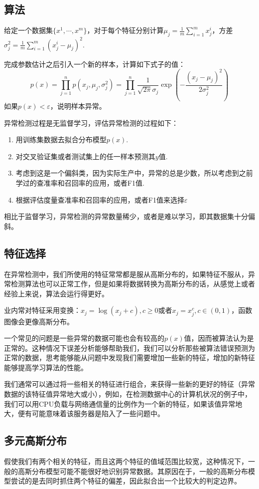 \documentclass[cn,hazy,blue,normal,14pt]{elegantnote}
\begin{document}
\subsection{算法}
给定一个数据集$\{x^1,\cdots,x^m\}$，对于每个特征分别计算$\mu_j=\frac{1}{m}\sum\limits_{i=1}^m x_j^i$，方差$\sigma_j^2=\frac{1}{m}\sum\limits_{i=1}^m (x_j^i-\mu_j)^2$.

完成参数估计之后引入一个新的样本，计算如下式子的值：
$$
p(x)=\prod_{j=1}^n p(x_j,\mu_j,\sigma_j^2)=\prod_{j=1}^n \frac{1}{\sqrt{2\pi}\sigma_j}\exp{(-\frac{(x_j-\mu_j)^2}{2\sigma_j^2})}
$$
如果$p(x)<\varepsilon$，说明样本异常。

异常检测过程是无监督学习，评估异常检测的过程如下：
\begin{enumerate}
    \item 用训练集数据去拟合分布模型$p(x)$.
    \item 对交叉验证集或者测试集上的任一样本预测其$y$值.
    \item 考虑到这是一个偏斜类，因为实际生产中，异常的总是少数，所以考虑到之前学过的查准率和召回率的应用，或者F1值.
    \item 根据评估度量查准率和召回率的应用，或者F1值来选择$\varepsilon$
\end{enumerate}

相比于监督学习，异常检测的异常数量稀少，或者是难以学习，即其数据集十分偏斜。
\subsection{特征选择}
在异常检测中，我们所使用的特征常常都是服从高斯分布的，如果特征不服从，异常检测算法也可以正常工作，但是如果将数据转换为高斯分布的话，从感觉上或者经验上来说，算法会运行得更好。

业内常对特征采用变换：$x_j=\log(x_j+c),c\geqslant 0$或者$x_j=x_j^c,c\in (0,1)$，函数图像会更像高斯分布。

一个常见的问题是一些异常的数据可能也会有较高的$p(x)$值，因而被算法认为是正常的。这种情况下误差分析能够帮助我们，我们可以分析那些被算法错误预测为正常的数据，思考能够能从问题中发现我们需要增加一些新的特征，增加的新特征能够提高学习算法的性能。

我们通常可以通过将一些相关的特征进行组合，来获得一些新的更好的特征（异常数据的该特征值异常地大或小），例如，在检测数据中心的计算机状况的例子中，我们可以用CPU负载与网络通信量的比例作为一个新的特征，如果该值异常地大，便有可能意味着该服务器是陷入了一些问题中。
\subsection{多元高斯分布}
假使我们有两个相关的特征，而且这两个特征的值域范围比较宽，这种情况下，一般的高斯分布模型可能不能很好地识别异常数据。其原因在于，一般的高斯分布模型尝试的是去同时抓住两个特征的偏差，因此拟合出一个比较大的判定边界。
\end{document}

